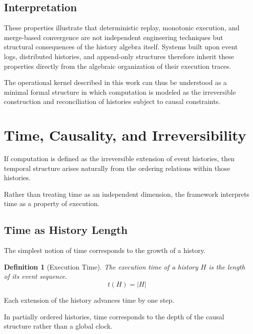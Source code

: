 \documentclass[12pt]{article}
\newtheorem{definition}{Definition}
\begin{document}
\subsection{Interpretation}

These properties illustrate that deterministic replay,
monotonic execution, and merge-based convergence are
not independent engineering techniques but structural
consequences of the history algebra itself. Systems
built upon event logs, distributed histories, and
append-only structures therefore inherit these
properties directly from the algebraic organization
of their execution traces.

The operational kernel described in this work can
thus be understood as a minimal formal structure
in which computation is modeled as the irreversible
construction and reconciliation of histories subject
to causal constraints.


\section{Time, Causality, and Irreversibility}

If computation is defined as the irreversible extension of
event histories, then temporal structure arises naturally
from the ordering relations within those histories.

Rather than treating time as an independent dimension,
the framework interprets time as a property of execution.

\subsection{Time as History Length}

The simplest notion of time corresponds to the growth
of a history.

\begin{definition}[Execution Time]
The execution time of a history $H$ is the length of
its event sequence.
\[
t(H) = |H|
\]
\end{definition}

Each extension of the history advances time by one step.

In partially ordered histories, time corresponds to the
depth of the causal structure rather than a global clock.
\end{document}
